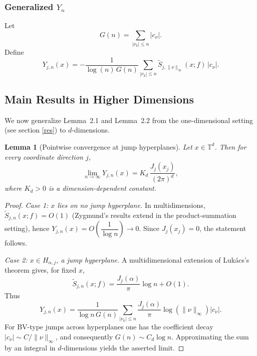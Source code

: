 \documentclass{amsart}
\newtheorem{lemma}[theorem]{Lemma}
\theoremstyle{definition}
\theoremstyle{remark}
\numberwithin{equation}{section}
\begin{document}
\subsubsection*{Generalized \(Y_n\)}
Let
\begin{equation*}
  G(n)=\sum_{|\nu_k|\le n}|c_\nu|.
\end{equation*}
Define
\begin{equation*}
  Y_{j,n}(x)
  = -\frac{1}{\log(n)\,G(n)}
  \sum_{|\nu_k|\le n}\widetilde S_{j,\|\nu\|_\infty}(x;f)\,|c_\nu|.
\end{equation*}

\subsection{Main Results in Higher Dimensions}

We now generalize Lemma~2.1 and Lemma~2.2 from the one-dimensional setting (see section \ref{res}) to \(d\)-dimensions.

\begin{lemma}[Pointwise convergence at jump hyperplanes]
\label{lem:pointwise-hd}
Let \(x\in\mathbb{T}^d\). Then for every coordinate direction \(j\),
\begin{equation*}
  \lim_{n\to\infty} Y_{j,n}(x)
     = K_d\,\frac{J_j(x_j)}{(2\pi)^d},
\end{equation*}
where \(K_d>0\) is a dimension-dependent constant.
\end{lemma}

\begin{proof}
\emph{Case 1: \(x\) lies on no jump hyperplane.}
In multidimensions, \(\widetilde S_{j,n}(x;f)=O(1)\) (Zygmund's results extend in the product-summation setting), hence
\(Y_{j,n}(x)=O\!\left(\dfrac{1}{\log n}\right)\to 0\).
Since \(J_j(x_j)=0\), the statement follows.

\emph{Case 2: \(x\in H_{\alpha,j}\), a jump hyperplane.}
A multidimensional extension of Luk\'acs's theorem gives, for fixed \(x\),
\begin{equation*}
  \widetilde S_{j,n}(x;f)
    =\frac{J_j(\alpha)}{\pi}\log n +O(1).
\end{equation*}
Thus
\begin{equation*}
  Y_{j,n}(x)
  =
  \frac{1}{\log n\,G(n)}
  \sum_{|\nu_k|\le n}
  \frac{J_j(\alpha)}{\pi}\log(\|\nu\|_\infty)|c_\nu|.
\end{equation*}
For BV-type jumps across hyperplanes one has the coefficient decay
\(|c_\nu|\sim C/\|\nu\|_\infty\), and consequently \(G(n)\sim C_d\log n\).
Approximating the sum by an integral in \(d\)-dimensions yields the asserted limit.
\end{proof}
\end{document}
